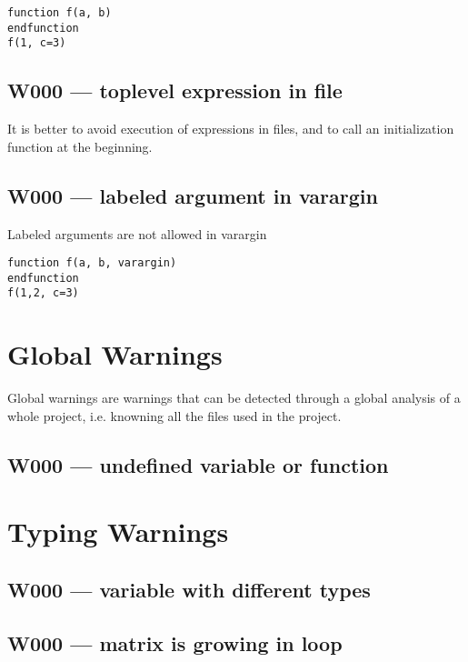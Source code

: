 \begin{verbatim}
function f(a, b)
endfunction
f(1, c=3)
\end{verbatim}


\subsection{W000 --- toplevel expression in file}




It is better to avoid execution of expressions in files, and
to call an initialization function at the beginning.



\subsection{W000 --- labeled argument in varargin}




Labeled arguments are not allowed in varargin

\begin{verbatim}
function f(a, b, varargin)
endfunction
f(1,2, c=3)
\end{verbatim}


\section{Global Warnings}

Global warnings are warnings that can be detected through a global
analysis of a whole project, i.e. knowning all the files used in the
project.

\subsection{W000 --- undefined variable or function}




\section{Typing Warnings}



\subsection{W000 --- variable with different types}




\subsection{W000 --- matrix is growing in loop}




